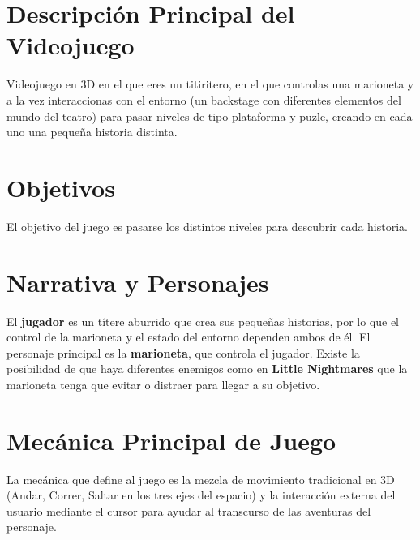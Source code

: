 \documentclass[12pt,twoside,letterpaper]{article}
\begin{document}



\newpage


\section{Descripción Principal del Videojuego}

Videojuego en 3D en el que eres un titiritero, en el que controlas una marioneta y a la vez interaccionas con el entorno (un backstage con diferentes elementos del mundo del teatro) para pasar niveles de tipo plataforma y puzle, creando en cada uno una pequeña historia distinta.

\section{Objetivos}

El objetivo del juego es pasarse los distintos niveles para descubrir cada historia.

\section{Narrativa y Personajes}

El \textbf{jugador} es un títere aburrido que crea sus pequeñas historias, por lo que el control de la marioneta y el estado del entorno dependen ambos de él.
El personaje principal es la \textbf{marioneta}, que controla el jugador.
Existe la posibilidad de que haya diferentes enemigos como en \textbf{Little Nightmares} que la marioneta tenga que evitar o distraer para llegar a su objetivo.


\section{Mecánica Principal de Juego}

La mecánica que define al juego es la mezcla de movimiento tradicional en 3D (Andar, Correr, Saltar en los tres ejes del espacio) y la interacción externa del usuario mediante el cursor para ayudar al transcurso de las aventuras del personaje.
\end{document}

